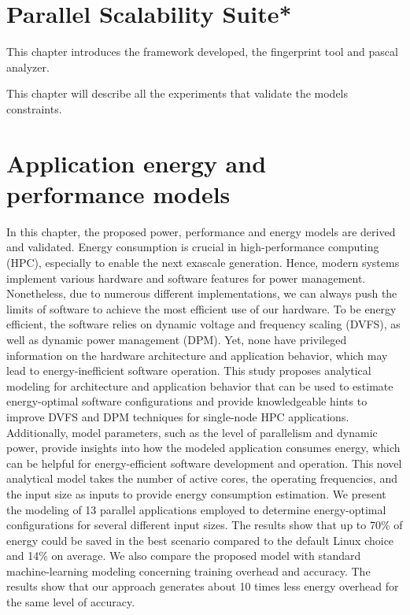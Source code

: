 \documentclass[
papersize=a4,
pagelayout=default,
fontname=latinmodern,
fontsize=11pt,
twoside,
final,
faculty=fpms,
]{umons-Thesis}
\begin{document}
	\chapter{Parallel Scalability Suite*}
	This chapter introduces the framework developed, the fingerprint tool and pascal analyzer.
	
	
	
	
	This chapter will describe all the experiments that validate the models constraints.
	
	
	\chapter{Application energy and performance models} \label{chapter:models}
	In this chapter, the proposed power, performance and energy models are derived and validated.
	Energy consumption is crucial in high-performance computing (HPC), especially to enable the next exascale generation. Hence, modern systems implement various hardware and software features for power management. Nonetheless, due to numerous different implementations, we can always push the limits of software to achieve the most efficient use of our hardware. To be
	energy efficient, the software relies on dynamic voltage and frequency scaling (DVFS), as well as dynamic power management (DPM). Yet, none have privileged information on the hardware architecture and application behavior, which may lead to energy-inefficient software operation. 
	This study  proposes analytical modeling for architecture and application behavior that can be used to estimate energy-optimal software configurations and provide knowledgeable hints to improve DVFS and DPM techniques for single-node HPC applications.
	Additionally, model parameters, such as the level of parallelism and dynamic power, provide insights into how the modeled application consumes energy, which can be helpful for energy-efficient software development and operation.
	This novel analytical model takes the number of active cores, the operating frequencies, and the input size as inputs to provide energy consumption estimation.
	We present the modeling of 13 parallel applications employed to determine energy-optimal configurations for several different input sizes.
	The results show that up to 70\% of energy could be saved in the best scenario compared to the default Linux choice and 14\% on average.
	We also compare the proposed model with standard machine-learning modeling concerning training overhead and accuracy. The results show that our approach generates about 10 times less energy overhead for the same level of accuracy.
	
	
\end{document}
